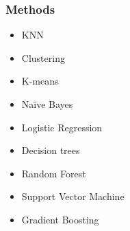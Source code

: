 \documentclass{beamer}
\begin{document}
\begin{frame}
    \frametitle{Methods}

    \begin{itemize}
        \item KNN
        
        \item Clustering
        \item K-means
        
        \item Naïve Bayes
        
        \item Logistic Regression
        
        \item Decision trees
        \item Random Forest
        
        \item Support Vector Machine
        \item Gradient Boosting

    \end{itemize}

\end{frame}
\end{document}

